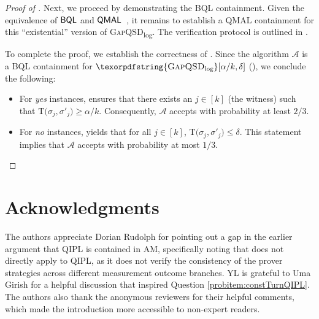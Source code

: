 \documentclass[11pt, a4paper]{article}
\numberwithin{equation}{section}
\numberwithin{figure}{section}
\newcommand{\AM}{\textnormal{\textsf{AM}}\xspace}
\newcommand{\QIPL}{\textnormal{\textsf{QIPL}}\xspace}
\newcommand{\QMAL}{\textnormal{\textsf{QMAL}}\xspace}
\newcommand{\BQL}{\textnormal{\textsf{BQL}}\xspace}
\newcommand{\GapQSDlog}{\texorpdfstring{\textnormal{\textsc{GapQSD}\textsubscript{log}}}\xspace}
\newcommand{\IndivProdQSD}{\textnormal{\textsc{IndivProdQSD}}\xspace}
\newcommand{\td}{\mathrm{T}}
\newcommand{\calA}{\mathcal{A}}
\begin{document}
\begin{proof}[Proof of ]
    \vspace{1em}
    Next, we proceed by demonstrating the \BQL{} containment. Given the equivalence of $\BQL$ and  $\QMAL$~\cite{FKLMN16,FR21}, it remains to establish a \QMAL{} containment for this ``existential'' version of \GapQSDlog{}. The verification protocol is outlined in . 


    To complete the proof, we establish the correctness of . Since the algorithm $\calA$ is a \BQL{} containment for $\GapQSDlog[\alpha/k,\delta]$ (), we conclude the following: 
    \begin{itemize}[topsep=0.33em, itemsep=0.33em, parsep=0.33em]
        \item For \textit{yes} instances,  ensures that there exists an  $j \in [k]$ (the witness) such that $\td\big(\sigma_j, \sigma'_j\big) \geq \alpha/k$. Consequently, $\calA$ accepts with probability at least $2/3$. 
        \item For \textit{no} instances,  yields that for all $j \in [k]$, $\td\big(\sigma_j, \sigma'_j\big) \leq \delta$. This statement implies that $\calA$ accepts with probability at most $1/3$. \qedhere
    \end{itemize}
\end{proof}


\section*{Acknowledgments}
\noindent
The authors appreciate Dorian Rudolph for pointing out a gap in the earlier argument that \QIPL{} is contained in \AM{}, specifically noting that  does not directly apply to \QIPL{}, as it does not verify the consistency of the prover strategies across different measurement outcome branches. 
YL is grateful to Uma Girish for a helpful discussion that inspired Question \ref{probitem:constTurnQIPL}. 
The authors also thank the anonymous reviewers for their helpful comments, which made the introduction more accessible to non-expert readers. 
\end{document}
